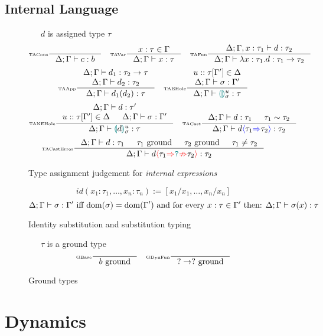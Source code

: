\subsection{Internal Language}


\begin{figure}[H]
\small
{}\ \ \ $d$ is assigned type $\tau$
\tiny
\[\inference[\tiny TACons]{}{\typeassignment{c}{b}}\quad
\inference[\tiny TAVar]{x : \tau \in \Gamma}{\typeassignment{x}{\tau}}\quad
\inference[\tiny TAFun]{\typeassignment[\Delta;\Gamma,x:\tau_1]{d}{\tau_2}}{\typeassignment{\lambda x:\tau_1. d}{\tau_1 \to \tau_2}}\]
\[\inference[\tiny TAApp]{\typeassignment{d_1}{\tau_2 \to \tau} \\ \typeassignment{d_2}{\tau_2}}{\typeassignment{d_1(d_2)}{\tau}} \quad 
\inference[\tiny TAEHole]{u :: \tau[\Gamma'] \in \Delta \\ \typeassignment{\sigma}{\Gamma'}}{\typeassignment{\hole^u_\sigma}{\tau}}\]
\[
\inference[\tiny TANEHole]{\typeassignment{d}{\tau'} \\ u :: \tau[\Gamma'] \in \Delta & \typeassignment{\sigma}{\Gamma'}}{\typeassignment{\hole[d]^u_\sigma}{\tau}}\quad 
\inference[\tiny TACast]{\typeassignment{d}{\tau_1} & \tau_1 \sim \tau_2}{\typeassignment{d\scast{\tau_1}{\tau_2}}{\tau_2}}\]
\[\inference[\tiny TACastError]{\typeassignment{d}{\tau_1} & \tau_1\text{ ground} & \tau_2\text{ ground} & \tau_1 \neq \tau_2}{\typeassignment{d\scasterror{\tau_1}{\tau_2}}{\tau_2}}\]
\caption{Type assignment judgement for \textit{internal expressions}}
\label{fig:typeassignment}
\end{figure}

\begin{figure}
\tiny
\[id(x_1:\tau_1, \dots, x_n:\tau_n) := [x_1/x_1, \dots, x_n/x_n]\]
\[\Delta;\Gamma \vdash \sigma : \Gamma' \text{ iff } \mathrm{dom}(\sigma) = \mathrm{dom}(\Gamma')\text{ and for every } x : \tau \in \Gamma' \text{ then:
} \Delta;\Gamma \vdash \sigma(x) : \tau\]
\caption{Identity substitution and substitution typing}
\label{fig:substitutiontyping}
\end{figure}

\begin{figure}[h]
\tiny
{}\ \ \ $\tau$ is a ground type
\[\inference[\tiny GBase]{}{b\text{ ground}}\quad \inference[\tiny GDynFun]{}{? \to ?\text{ ground}}\]
\caption{Ground types}
\label{fig:groundtypes}
\end{figure}

\section{Dynamics}

